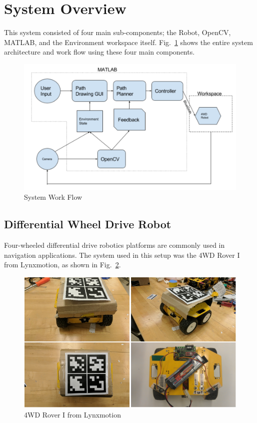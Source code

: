\documentclass[12pt,american]{report}
\begin{document}
\section{System Overview}
This system consisted of four main sub-components; the Robot, OpenCV, MATLAB, and the Environment workspace itself. Fig.~\ref{fig:workflow} shows the entire system architecture and work flow using these four main components.
\begin{figure}[h!]
\centering
\includegraphics[scale=.5]{images/workflow.PNG}
\caption{System Work Flow}
\label{fig:workflow}
\end{figure}

\subsection{Differential Wheel Drive Robot}
Four-wheeled differential drive robotics platforms are commonly used in navigation applications. The system used in this setup was the 4WD Rover I from Lynxmotion, as shown in Fig.~\ref{fig:robot}.

\begin{figure}[h!]
\centering
\includegraphics[scale=.5]{images/robot.PNG}
\caption{4WD Rover I from Lynxmotion}
\label{fig:robot}
\end{figure}
\end{document}
